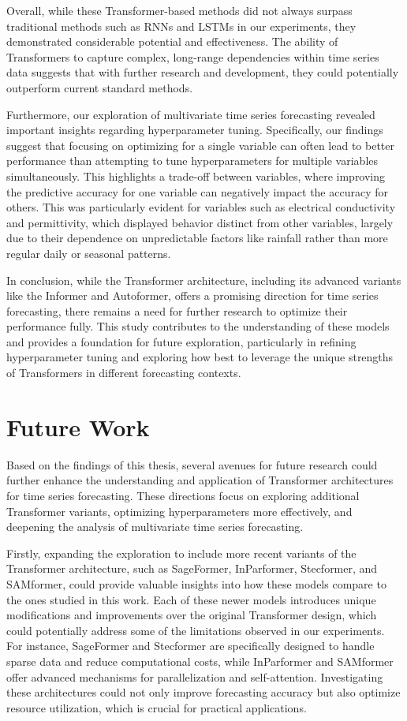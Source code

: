 Overall, while these Transformer-based methods did not always surpass traditional methods such as RNNs and LSTMs in our experiments, they demonstrated considerable potential and effectiveness. The ability of Transformers to capture complex, long-range dependencies within time series data suggests that with further research and development, they could potentially outperform current standard methods.

Furthermore, our exploration of multivariate time series forecasting revealed important insights regarding hyperparameter tuning. Specifically, our findings suggest that focusing on optimizing for a single variable can often lead to better performance than attempting to tune hyperparameters for multiple variables simultaneously. This highlights a trade-off between variables, where improving the predictive accuracy for one variable can negatively impact the accuracy for others. This was particularly evident for variables such as electrical conductivity and permittivity, which displayed behavior distinct from other variables, largely due to their dependence on unpredictable factors like rainfall rather than more regular daily or seasonal patterns.

In conclusion, while the Transformer architecture, including its advanced variants like the Informer and Autoformer, offers a promising direction for time series forecasting, there remains a need for further research to optimize their performance fully. This study contributes to the understanding of these models and provides a foundation for future exploration, particularly in refining hyperparameter tuning and exploring how best to leverage the unique strengths of Transformers in different forecasting contexts.

\section{Future Work}

Based on the findings of this thesis, several avenues for future research could further enhance the understanding and application of Transformer architectures for time series forecasting. These directions focus on exploring additional Transformer variants, optimizing hyperparameters more effectively, and deepening the analysis of multivariate time series forecasting.

Firstly, expanding the exploration to include more recent variants of the Transformer architecture, such as SageFormer, InParformer, Stecformer, and SAMformer, could provide valuable insights into how these models compare to the ones studied in this work. Each of these newer models introduces unique modifications and improvements over the original Transformer design, which could potentially address some of the limitations observed in our experiments. For instance, SageFormer and Stecformer are specifically designed to handle sparse data and reduce computational costs, while InParformer and SAMformer offer advanced mechanisms for parallelization and self-attention. Investigating these architectures could not only improve forecasting accuracy but also optimize resource utilization, which is crucial for practical applications.

